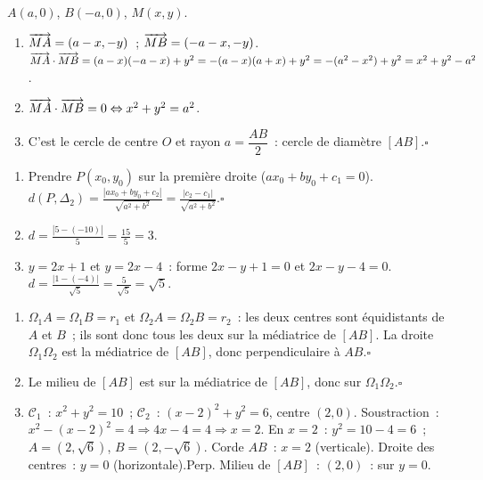 
$A(a,0)$, $B(-a,0)$, $M(x,y)$.
\begin{enumerate}
  \item $\overrightarrow{MA}=(a-x,-y)$~; $\overrightarrow{MB}=(-a-x,-y)$.
        $\overrightarrow{MA}\cdot\overrightarrow{MB}=(a-x)(-a-x)+y^2=-(a-x)(a+x)+y^2=-(a^2-x^2)+y^2=x^2+y^2-a^2$.
  \item $\overrightarrow{MA}\cdot\overrightarrow{MB}=0\Leftrightarrow x^2+y^2=a^2$.
  \item C'est le cercle de centre $O$ et rayon $a=\dfrac{AB}{2}$~: cercle de diam\`etre $[AB]$.\hfill$\square$
\end{enumerate}


\begin{enumerate}
  \item Prendre $P(x_0,y_0)$ sur la premi\`ere droite ($ax_0+by_0+c_1=0$).
        $d(P,\Delta_2)=\frac{|ax_0+by_0+c_2|}{\sqrt{a^2+b^2}}=\frac{|c_2-c_1|}{\sqrt{a^2+b^2}}$.\hfill$\square$
  \item $d=\frac{|5-(-10)|}{5}=\frac{15}{5}=3$.
  \item $y=2x+1$ et $y=2x-4$~: forme $2x-y+1=0$ et $2x-y-4=0$.
        $d=\frac{|1-(-4)|}{\sqrt{5}}=\frac{5}{\sqrt{5}}=\sqrt{5}$.
\end{enumerate}


\begin{enumerate}
  \item $\Omega_1A=\Omega_1B=r_1$ et $\Omega_2A=\Omega_2B=r_2$~:
        les deux centres sont \'equidistants de $A$ et $B$~; ils sont donc tous les deux sur la
        m\'ediatrice de $[AB]$. La droite $\Omega_1\Omega_2$ est la m\'ediatrice de $[AB]$,
        donc perpendiculaire \`a $AB$.\hfill$\square$
  \item Le milieu de $[AB]$ est sur la m\'ediatrice de $[AB]$, donc sur $\Omega_1\Omega_2$.\hfill$\square$
  \item $\mathcal{C}_1$~: $x^2+y^2=10$~; $\mathcal{C}_2$~: $(x-2)^2+y^2=6$, centre $(2,0)$.
        Soustraction~: $x^2-(x-2)^2=4\Rightarrow4x-4=4\Rightarrow x=2$.
        En $x=2$~: $y^2=10-4=6$~; $A=(2,\sqrt{6})$, $B=(2,-\sqrt{6})$.
        Corde $AB$~: $x=2$ (verticale). Droite des centres~: $y=0$ (horizontale).\checkmark\quad Perp.
        Milieu de $[AB]$~: $(2,0)$~: sur $y=0$.\checkmark
\end{enumerate}


